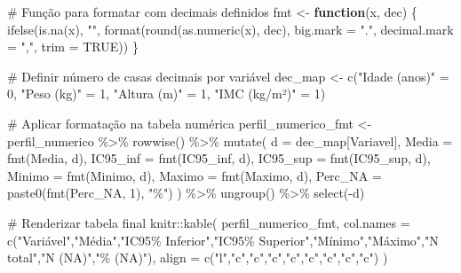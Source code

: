 \documentclass[
]{article}
\newenvironment{Shaded}{\begin{snugshade}}{\end{snugshade}}
\newcommand{\AttributeTok}[1]{\textcolor[rgb]{0.40,0.45,0.13}{#1}}
\newcommand{\CommentTok}[1]{\textcolor[rgb]{0.37,0.37,0.37}{#1}}
\newcommand{\ConstantTok}[1]{\textcolor[rgb]{0.56,0.35,0.01}{#1}}
\newcommand{\ControlFlowTok}[1]{\textcolor[rgb]{0.00,0.23,0.31}{\textbf{#1}}}
\newcommand{\DecValTok}[1]{\textcolor[rgb]{0.68,0.00,0.00}{#1}}
\newcommand{\FunctionTok}[1]{\textcolor[rgb]{0.28,0.35,0.67}{#1}}
\newcommand{\NormalTok}[1]{\textcolor[rgb]{0.00,0.23,0.31}{#1}}
\newcommand{\OtherTok}[1]{\textcolor[rgb]{0.00,0.23,0.31}{#1}}
\newcommand{\SpecialCharTok}[1]{\textcolor[rgb]{0.37,0.37,0.37}{#1}}
\newcommand{\StringTok}[1]{\textcolor[rgb]{0.13,0.47,0.30}{#1}}
\begin{document}
\begin{Shaded}
\begin{Highlighting}[]
\CommentTok{\# Função para formatar com decimais definidos}
\NormalTok{fmt }\OtherTok{\textless{}{-}} \ControlFlowTok{function}\NormalTok{(x, dec) \{}
  \FunctionTok{ifelse}\NormalTok{(}\FunctionTok{is.na}\NormalTok{(x), }\StringTok{""}\NormalTok{,}
         \FunctionTok{format}\NormalTok{(}\FunctionTok{round}\NormalTok{(}\FunctionTok{as.numeric}\NormalTok{(x), dec),}
                \AttributeTok{big.mark =} \StringTok{"."}\NormalTok{, }\AttributeTok{decimal.mark =} \StringTok{","}\NormalTok{, }\AttributeTok{trim =} \ConstantTok{TRUE}\NormalTok{))}
\NormalTok{\}}

\CommentTok{\# Definir número de casas decimais por variável}
\NormalTok{dec\_map }\OtherTok{\textless{}{-}} \FunctionTok{c}\NormalTok{(}\StringTok{"Idade (anos)"} \OtherTok{=} \DecValTok{0}\NormalTok{,}
             \StringTok{"Peso (kg)"}    \OtherTok{=} \DecValTok{1}\NormalTok{,}
             \StringTok{"Altura (m)"}   \OtherTok{=} \DecValTok{1}\NormalTok{,}
             \StringTok{"IMC (kg/m²)"}  \OtherTok{=} \DecValTok{1}\NormalTok{)}

\CommentTok{\# Aplicar formatação na tabela numérica}
\NormalTok{perfil\_numerico\_fmt }\OtherTok{\textless{}{-}}\NormalTok{ perfil\_numerico }\SpecialCharTok{\%\textgreater{}\%}
  \FunctionTok{rowwise}\NormalTok{() }\SpecialCharTok{\%\textgreater{}\%}
  \FunctionTok{mutate}\NormalTok{(}
    \AttributeTok{d =}\NormalTok{ dec\_map[Variavel],}
    \AttributeTok{Media    =} \FunctionTok{fmt}\NormalTok{(Media, d),}
    \AttributeTok{IC95\_inf =} \FunctionTok{fmt}\NormalTok{(IC95\_inf, d),}
    \AttributeTok{IC95\_sup =} \FunctionTok{fmt}\NormalTok{(IC95\_sup, d),}
    \AttributeTok{Minimo   =} \FunctionTok{fmt}\NormalTok{(Minimo, d),}
    \AttributeTok{Maximo   =} \FunctionTok{fmt}\NormalTok{(Maximo, d),}
    \AttributeTok{Perc\_NA  =} \FunctionTok{paste0}\NormalTok{(}\FunctionTok{fmt}\NormalTok{(Perc\_NA, }\DecValTok{1}\NormalTok{), }\StringTok{"\%"}\NormalTok{)}
\NormalTok{  ) }\SpecialCharTok{\%\textgreater{}\%}
  \FunctionTok{ungroup}\NormalTok{() }\SpecialCharTok{\%\textgreater{}\%}
  \FunctionTok{select}\NormalTok{(}\SpecialCharTok{{-}}\NormalTok{d)}

\CommentTok{\# Renderizar tabela final}
\NormalTok{knitr}\SpecialCharTok{::}\FunctionTok{kable}\NormalTok{(}
\NormalTok{  perfil\_numerico\_fmt,}
  \AttributeTok{col.names =} \FunctionTok{c}\NormalTok{(}\StringTok{"Variável"}\NormalTok{,}\StringTok{"Média"}\NormalTok{,}\StringTok{"IC95\% Inferior"}\NormalTok{,}\StringTok{"IC95\% Superior"}\NormalTok{,}\StringTok{"Mínimo"}\NormalTok{,}\StringTok{"Máximo"}\NormalTok{,}\StringTok{"N total"}\NormalTok{,}\StringTok{"N (NA)"}\NormalTok{,}\StringTok{"\% (NA)"}\NormalTok{),}
  \AttributeTok{align =} \FunctionTok{c}\NormalTok{(}\StringTok{"l"}\NormalTok{,}\StringTok{"c"}\NormalTok{,}\StringTok{"c"}\NormalTok{,}\StringTok{"c"}\NormalTok{,}\StringTok{"c"}\NormalTok{,}\StringTok{"c"}\NormalTok{,}\StringTok{"c"}\NormalTok{,}\StringTok{"c"}\NormalTok{,}\StringTok{"c"}\NormalTok{)}
\NormalTok{)}
\end{Highlighting}
\end{Shaded}
\end{document}
